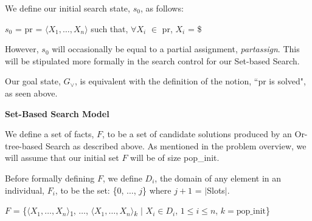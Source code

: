 \documentclass[11pt, oneside]{article}   	%
\newenvironment{cmr}{\fontfamily{cmr}\selectfont}{\par}
\begin{document}
\noindent We define our initial search state, $s_0$, as follows:

\noindent \centerline{$s_0$ = pr = $\langle X_1, \dots, X_n\rangle$ such that, $\forall X_i$ $\in$ pr, $X_i$ = \$}

\noindent However, $s_0$ will occasionally be equal to a partial assignment, \textit{partassign}. This will be stipulated more formally in the search control for our Set-based Search.

\noindent Our goal state, $G_{\lor}$, is equivalent with the definition of the notion, ``pr is solved", as seen above.\\
\newpage

\noindent \textbf{Set-Based Search Model}

\begin{cmr}
\noindent We define a set of facts, $F$, to be a set of candidate solutions produced by an Or-tree-based Search as described above.
As mentioned in the problem overview, we will assume that our initial set $F$ will be of size pop_init.
\end{cmr}

\noindent Before formally defining $F$, we define $D_i$, the domain of any element in an individual, $F_i$, to be the set: \{0, $\dots$, $j$\} where $j+1$ = $\vert$Slots$\vert$.

\noindent \centerline{$F$ = \{$\langle X_1, \dots, X_n\rangle$\textsubscript{$1$}, $\dots$, $\langle X_1, \dots, X_n\rangle$\textsubscript{$k$} $\vert$ $X_i \in D_i$, $1 \le i \le n$, $k = \text{pop_init}$\}}
\end{document}
